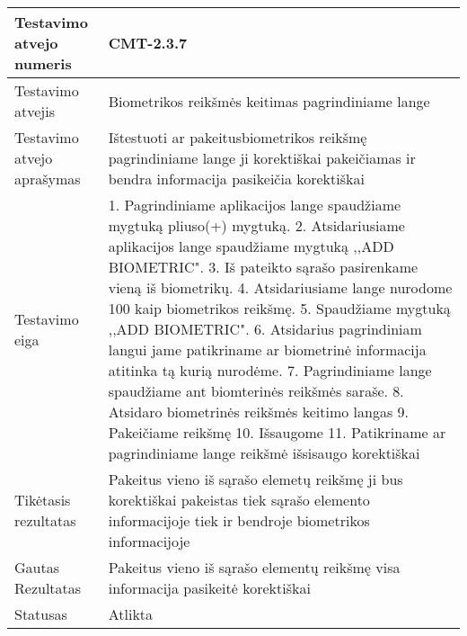 \documentclass[oneside]{VUMIFPSkursinis}
\begin{document}
\begin{center}
    \begin{tabular}{ |p{5cm}|p{13cm}|}
    \hline
        Testavimo atvejo numeris & CMT-2.3.7  \\ \hline
        Testavimo atvejis & Biometrikos reikšmės keitimas pagrindiniame lange \\ \hline
        Testavimo atvejo aprašymas & Ištestuoti ar pakeitusbiometrikos reikšmę pagrindiniame lange ji korektiškai pakeičiamas ir bendra informacija pasikeičia korektiškai \\ \hline
        Testavimo eiga &  1. Pagrindiniame aplikacijos lange spaudžiame mygtuką pliuso(+) mygtuką. 
				2. Atsidariusiame aplikacijos lange spaudžiame mygtuką ,,ADD BIOMETRIC". 
				3. Iš pateikto sąrašo pasirenkame vieną iš biometrikų. 
				4. Atsidariusiame lange nurodome 100 kaip biometrikos reikšmę.
				5. Spaudžiame mygtuką ,,ADD BIOMETRIC".
				6. Atsidarius pagrindiniam langui jame patikriname ar biometrinė informacija atitinka tą kurią nurodėme.
				7. Pagrindiniame lange spaudžiame ant biomterinės reikšmės saraše.
				8. Atsidaro biometrinės reikšmės keitimo langas
				9. Pakeičiame reikšmę
				10. Išsaugome
				11. Patikriname ar pagrindiniame lange reikšmė išsisaugo korektiškai \\ \hline
        Tikėtasis rezultatas &  Pakeitus vieno iš sąrašo elemetų reikšmę ji bus korektiškai pakeistas tiek sąrašo elemento informacijoje tiek ir bendroje biometrikos informacijoje \\ \hline
        Gautas Rezultatas & Pakeitus vieno iš sąrašo elementų reikšmę visa informacija pasikeitė korektiškai \\ \hline
        Statusas &  Atlikta\\ \hline
    \hline
    \end{tabular}
\end{center}

\iffalse XXXXXXXXXXXXXXXXXXXXXXXXXXXXXXXXXXXXXXXXXXXXXXXXXXXXXXXXXXXXXXXXXXXXXXXXXXXXXXXXXXXXXXXXXXXXXXXXXXXXXXXXXXXXXXXXXXXXXXXXXXXXXXXXXXXXXXX \fi
\pagebreak
\end{document}
